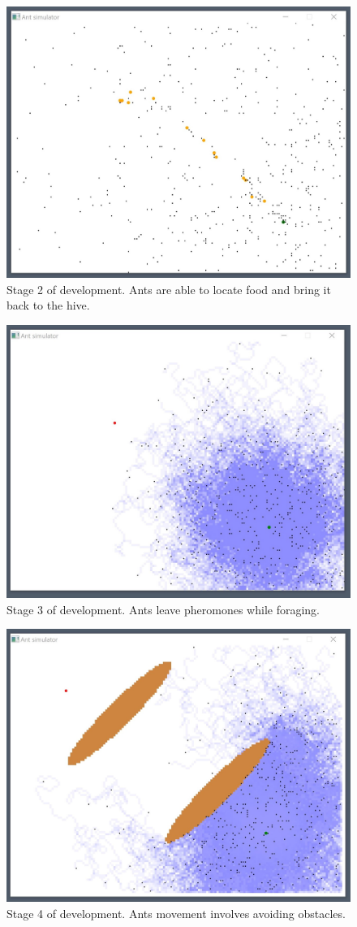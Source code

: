 \documentclass[a4paper, oneside, 11pt]{report}
\begin{document}
\begin{figure}[htb]
	\begin{center}
		\includegraphics[width=0.65 \columnwidth]{Stage_2.jpg}
		\caption{Stage 2 of development. Ants are able to locate food and bring it back to the hive.}
		\label{fig:Stage 2}
	\end{center}
\end{figure}

\begin{figure}[htb]
	\begin{center}
		\includegraphics[width=0.65 \columnwidth]{Stage_3.jpg}
		\caption{Stage 3 of development. Ants leave pheromones while foraging.}
		\label{fig:Stage 3}
	\end{center}
\end{figure}

\begin{figure}[htb]
	\begin{center}
		\includegraphics[width=0.65 \columnwidth]{Stage_4.jpg}
		\caption{Stage 4 of development. Ants movement involves avoiding obstacles.}
		\label{fig:Stage 4}
	\end{center}
\end{figure}
\end{document}
